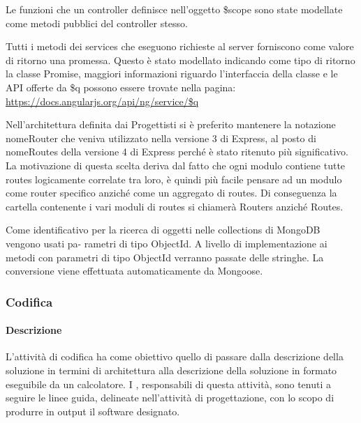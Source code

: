 Le funzioni che un controller definisce nell’oggetto \$scope sono state modellate come metodi pubblici del controller stesso.

Tutti i metodi dei services che eseguono richieste al server forniscono come valore di ritorno una promessa. Questo è stato modellato indicando come tipo di ritorno la classe Promise, maggiori informazioni riguardo l’interfaccia della classe e le API offerte da \$q possono essere trovate nella pagina: \href{url}{https://docs.angularjs.org/api/ng/service/\$q}

Nell’architettura definita dai Progettisti si è preferito mantenere la notazione nomeRouter che
veniva utilizzato nella versione 3 di Express, al posto di nomeRoutes della versione 4 di Express
perché è stato ritenuto più significativo. La motivazione di questa scelta deriva dal fatto che ogni modulo
contiene tutte routes logicamente correlate tra loro, è quindi più facile pensare ad un modulo come router
specifico anziché come un aggregato di routes. Di conseguenza la cartella contenente i vari moduli di
routes si chiamerà Routers anziché Routes.

Come identificativo per la ricerca di oggetti nelle collections di MongoDB vengono usati pa-
rametri di tipo ObjectId. A livello di implementazione ai metodi con parametri di tipo ObjectId
verranno passate delle stringhe. La conversione viene effettuata automaticamente da Mongoose.

\subsubsection{Codifica}

\paragraph{Descrizione}
L'attività di codifica ha come obiettivo quello di passare dalla descrizione della soluzione in termini di architettura alla descrizione della soluzione in formato eseguibile da un calcolatore. I \textit{\Progrs}, responsabili di questa attività, sono tenuti a seguire le linee guida, delineate nell'attività di progettazione, con lo scopo di produrre in output il software designato.

